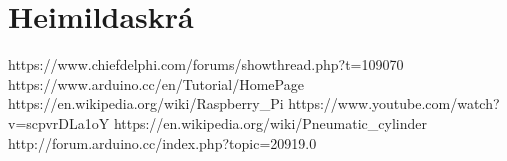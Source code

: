 \section{Heimildaskrá}
https://www.chiefdelphi.com/forums/showthread.php?t=109070
https://www.arduino.cc/en/Tutorial/HomePage
https://en.wikipedia.org/wiki/Raspberry_Pi
https://www.youtube.com/watch?v=scpvrDLa1oY
https://en.wikipedia.org/wiki/Pneumatic_cylinder
http://forum.arduino.cc/index.php?topic=20919.0
